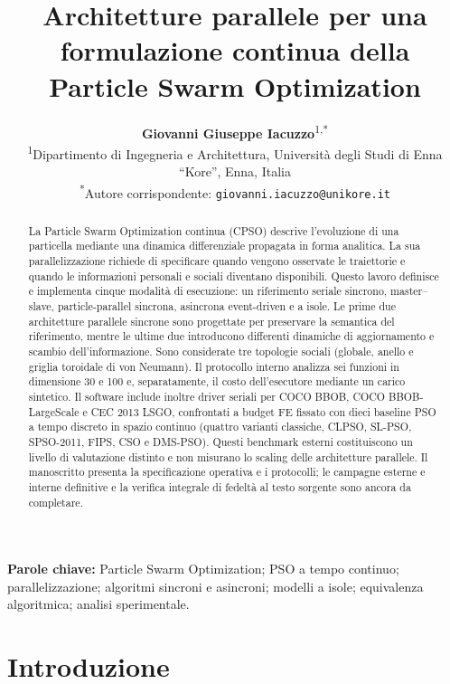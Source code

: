 \documentclass[10pt,a4paper,twocolumn]{article}
\title{Architetture parallele per una formulazione continua della Particle Swarm Optimization}
\author{
  \textbf{Giovanni Giuseppe Iacuzzo}\textsuperscript{1,*} \\
  \small \textsuperscript{1}Dipartimento di Ingegneria e Architettura, Università degli Studi di Enna ``Kore'', Enna, Italia \\
  \small \textsuperscript{*}Autore corrispondente: \texttt{giovanni.iacuzzo@unikore.it}
}
\date{}
\begin{document}
\maketitle

\begin{abstract}
La Particle Swarm Optimization continua (CPSO) descrive l'evoluzione di una particella mediante una dinamica differenziale propagata in forma analitica. La sua parallelizzazione richiede di specificare quando vengono osservate le traiettorie e quando le informazioni personali e sociali diventano disponibili. Questo lavoro definisce e implementa cinque modalità di esecuzione: un riferimento seriale sincrono, master--slave, particle-parallel sincrona, asincrona event-driven e a isole. Le prime due architetture parallele sincrone sono progettate per preservare la semantica del riferimento, mentre le ultime due introducono differenti dinamiche di aggiornamento e scambio dell'informazione. Sono considerate tre topologie sociali (globale, anello e griglia toroidale di von Neumann). Il protocollo interno analizza sei funzioni in dimensione 30 e 100 e, separatamente, il costo dell'esecutore mediante un carico sintetico. Il software include inoltre driver seriali per COCO BBOB, COCO BBOB-LargeScale e CEC 2013 LSGO, confrontati a budget FE fissato con dieci baseline PSO a tempo discreto in spazio continuo (quattro varianti classiche, CLPSO, SL-PSO, SPSO-2011, FIPS, CSO e DMS-PSO). Questi benchmark esterni costituiscono un livello di valutazione distinto e non misurano lo scaling delle architetture parallele. Il manoscritto presenta la specificazione operativa e i protocolli; le campagne esterne e interne definitive e la verifica integrale di fedeltà al testo sorgente sono ancora da completare.
\end{abstract}

\noindent\textbf{Parole chiave:} Particle Swarm Optimization; PSO a tempo continuo; parallelizzazione; algoritmi sincroni e asincroni; modelli a isole; equivalenza algoritmica; analisi sperimentale.
\newpage

\section{Introduzione}
\label{sec:introduction}

\FloatBarrier


\FloatBarrier

\FloatBarrier
\end{document}
